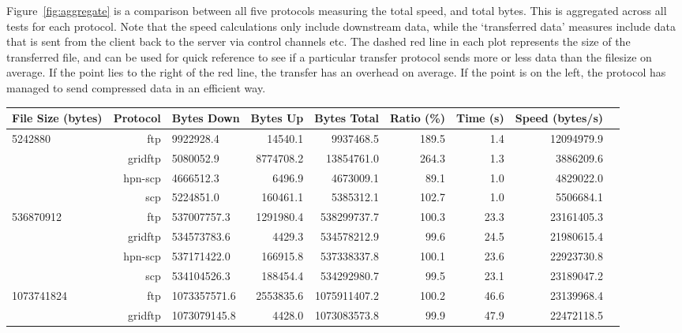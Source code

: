 \documentclass{sig-alternate-05-2015}
\begin{document}
Figure~\ref{fig:aggregate} is a comparison between all five protocols measuring the total speed, and total bytes. This is aggregated across all tests for each protocol. Note that the speed calculations only include downstream data, while the `transferred data' measures include data that is sent from the client back to the server via control channels etc. The dashed red line in each plot represents the size of the transferred file, and can be used for quick reference to see if a particular transfer protocol sends more or less data than the filesize on average. If the point lies to the right of the red line, the transfer has an overhead on average. If the point is on the left, the protocol has managed to send compressed data in an efficient way.

\begin{table}
\centering
	\begin{tabular}{lrlrrrrrr}
	\toprule
	File Size (bytes) & Protocol &   Bytes Down &  Bytes Up &  Bytes Total &  Ratio (\%) &  Time (s) &  Speed (bytes/s) \\
	\midrule
	   5242880 &      ftp &    9922928.4 &   14540.1 &    9937468.5 &      189.5 &       1.4 &       12094979.9 \\
			   &  gridftp &    5080052.9 & 8774708.2 &   13854761.0 &      264.3 &       1.3 &        3886209.6 \\
			   &  hpn-scp &    4666512.3 &    6496.9 &    4673009.1 &       89.1 &       1.0 &        4829022.0 \\
			   &      scp &    5224851.0 &  160461.1 &    5385312.1 &      102.7 &       1.0 &        5506684.1 \\
	\midrule
	 536870912 &      ftp &  537007757.3 & 1291980.4 &  538299737.7 &      100.3 &      23.3 &       23161405.3 \\
			   &  gridftp &  534573783.6 &    4429.3 &  534578212.9 &       99.6 &      24.5 &       21980615.4 \\
			   &  hpn-scp &  537171422.0 &  166915.8 &  537338337.8 &      100.1 &      23.6 &       22923730.8 \\
			   &      scp &  534104526.3 &  188454.4 &  534292980.7 &       99.5 &      23.1 &       23189047.2 \\
	\midrule
	1073741824 &      ftp & 1073357571.6 & 2553835.6 & 1075911407.2 &      100.2 &      46.6 &       23139968.4 \\
	           &  gridftp & 1073079145.8 &    4428.0 & 1073083573.8 &       99.9 &      47.9 &       22472118.5 \\

\end{tabular}
\end{table}
\end{document}
